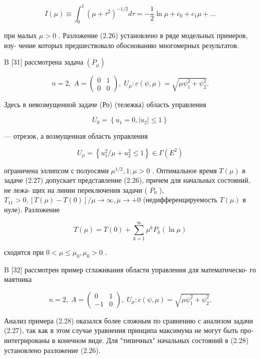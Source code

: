 \documentclass[10pt]{article}
\begin{document}
\[
I\left( \mu \right)  \equiv  {\int }_{0}^{1}{\left( \mu  + {\tau }^{2}\right) }^{-1/2}{d\tau } =  - \frac{1}{2}\ln \mu  + {c}_{0} + {c}_{1}\mu  + \ldots
\]

при малых \(\mu  > 0\) . Разложение (2.26) установлено в ряде модельных примеров, изу- чение которых предшествовало обоснованию многомерных результатов.

B [31] рассмотрена задача \(\left( {P}_{\mu }\right)\)

\[
n = 2,\;A = \left( \begin{array}{ll} 0 & 1 \\  0 & 0 \end{array}\right) ,\;{U}_{\mu } : c\left( {\psi ,\mu }\right)  = \sqrt{\mu {\psi }_{1}^{2} + {\psi }_{2}^{2}}. \tag{2.27}
\]

Здесь в невозмущенной задаче (Ро) (тележка) область управления

\[
{U}_{0} = \left\{  {{u}_{1} = 0,\left| {u}_{2}\right|  \leq  1}\right\}
\]

— отрезок, а возмущенная область управления

\[
{U}_{\mu } = \left\{  {{u}_{1}^{2}/\mu  + {u}_{2}^{2} \leq  1}\right\}   \in  \Gamma \left( {E}^{2}\right)
\]

ограничена эллипсом с полуосями \({\mu }^{1/2},1;\mu  > 0\) . Оптимальное время \(T\left( \mu \right)\) в задаче (2.27) допускает представление (2.26), причем для начальных состояний, не лежа- щих на линии переключения задачи ( \({P}_{0}\) ), \({T}_{11} > 0,\left[  {T\left( \mu \right)  - T\left( 0\right) }\right]  /\mu  \rightarrow  \infty ,\mu  \rightarrow   + 0\) (недифференцируемость \(T\left( \mu \right)\) в нуле). Разложение

\[
T\left( \mu \right)  = T\left( 0\right)  + \mathop{\sum }\limits_{{k = 1}}^{\infty }{\mu }^{k}{P}_{k}\left( {\ln \mu }\right)
\]

сходится при \(0 < \mu  \leq  {\mu }_{0},{\mu }_{0} > 0\) .

B [32] рассмотрен пример сглаживания области управления для математическо- го маятника

\[
n = 2,\;A = \left( \begin{array}{cc} 0 & 1 \\   - 1 & 0 \end{array}\right) ,\;{U}_{\mu } : c\left( {\psi ,\mu }\right)  = \sqrt{\mu {\psi }_{1}^{2} + {\psi }_{2}^{2}}. \tag{2.28}
\]

Анализ примера (2.28) оказался более сложным по сравнению с анализом задачи (2.27), так как в этом случае уравнения принципа максимума не могут быть про- интегрированы в конечном виде. Для "типичных" начальных состояний в (2.28) установлено разложение (2.26).
\end{document}

